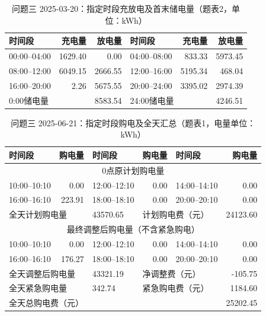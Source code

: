 \begin{table}[H]
\centering\footnotesize
\setlength{\tabcolsep}{4pt}
\caption{问题三 2025-03-20：指定时段充放电及首末储电量（题表2，单位：kWh）}
\label{tab:required-q3-2025-03-20-storage}
\begin{tabular}{@{}lrrlrr@{}}
\toprule
时间段 & 充电量 & 放电量 & 时间段 & 充电量 & 放电量 \\
\midrule
00:00--04:00 & 1629.40 & 0.00 & 04:00--08:00 & 833.33 & 5973.45 \\
08:00--12:00 & 6049.15 & 2666.55 & 12:00--16:00 & 5195.34 & 468.04 \\
16:00--20:00 & 2.26 & 5675.55 & 20:00--24:00 & 3395.02 & 2974.39 \\
\multicolumn{2}{l}{0:00储电量} & 8583.54 & \multicolumn{2}{l}{24:00储电量} & 4246.51 \\
\bottomrule
\end{tabular}
\end{table}

\FloatBarrier
\begin{table}[H]
\centering\footnotesize
\setlength{\tabcolsep}{4pt}
\caption{问题三 2025-06-21：指定时段购电及全天汇总（题表1，电量单位：kWh）}
\label{tab:required-q3-2025-06-21-grid}
\begin{tabular}{@{}lrlrlr@{}}
\toprule
时间段 & 购电量 & 时间段 & 购电量 & 时间段 & 购电量 \\
\midrule
\multicolumn{6}{c}{0点原计划购电量} \\
10:00--10:10 & 0.00 & 12:00--12:10 & 0.00 & 14:00--14:10 & 0.00 \\
16:00--16:10 & 223.91 & 18:00--18:10 & 0.00 & 20:00--20:10 & 0.00 \\
\multicolumn{2}{l}{全天计划购电量} & 43570.65 & \multicolumn{2}{l}{计划购电费（元）} & 24123.60 \\
\multicolumn{6}{c}{最终调整后购电量（不含紧急购电）} \\
10:00--10:10 & 0.00 & 12:00--12:10 & 0.00 & 14:00--14:10 & 0.00 \\
16:00--16:10 & 176.27 & 18:00--18:10 & 0.00 & 20:00--20:10 & 0.00 \\
\multicolumn{2}{l}{全天调整后购电量} & 43321.19 & \multicolumn{2}{l}{净调整费（元）} & -105.75 \\
\multicolumn{2}{l}{全天紧急购电量} & 342.74 & \multicolumn{2}{l}{紧急购电费（元）} & 1184.60 \\
\multicolumn{5}{l}{全天总购电费（元）} & 25202.45 \\
\bottomrule
\end{tabular}
\end{table}

